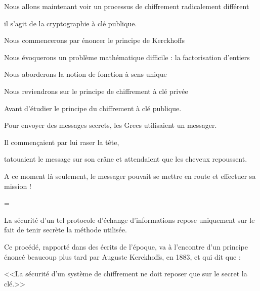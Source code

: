 







\debuttexte


\diapo

Nous allons maintenant voir un processus de chiffrement radicalement différent

il s'agit de la cryptographie à clé publique.

\change

\change

Nous commencerons par énoncer le principe de Kerckhoffs

\change

Nous évoquerons un problème mathématique difficile : la factorisation d'entiers

\change

Nous aborderons la notion de fonction à sens unique

\change

Nous reviendrons sur le principe de chiffrement à clé privée

\change

Avant d'étudier le principe du chiffrement à clé publique.
  

\diapo

Pour envoyer des messages secrets, les Grecs utilisaient un messager.

Il commençaient par lui raser la tête,

tatouaient le message sur son crâne et attendaient que les cheveux repoussent.

A ce moment là seulement, le messager pouvait se mettre en route et effectuer sa mission !

=

La sécurité d'un tel protocole d'échange d'informations repose uniquement sur le fait de tenir secrète la méthode utilisée.

\change

Ce procédé, rapporté dans des écrits de l'époque, va à l'encontre d'un principe énoncé beaucoup plus tard par
Auguste Kerckhoffs, en 1883, et qui dit que : 

\centerline{<<La sécurité d'un système de chiffrement ne doit reposer que sur le secret la clé.>>}

